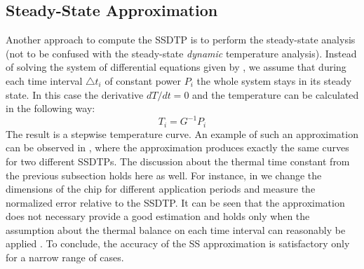 \subsection{Steady-State Approximation}
Another approach to compute the SSDTP is to perform the steady-state analysis \cite{huang2009} (not to be confused with the steady-state \emph{dynamic} temperature analysis). Instead of solving the system of differential equations given by , we assume that during each time interval $\triangle t_i$ of constant power $P_i$ the whole system stays in its steady state. In this case the derivative \mbox{$dT/dt = 0$} and the temperature can be calculated in the following way:
\[
  T_i = G^{-1} P_i
\]
The result is a stepwise temperature curve. An example of such an approximation can be observed in , where the approximation produces exactly the same curves for two different SSDTPs. The discussion about the thermal time constant from the previous subsection holds here as well. For instance, in  we change the dimensions of the chip for different application periods and measure the normalized error relative to the SSDTP. It can be seen that the approximation does not necessary provide a good estimation and holds only when the assumption about the thermal balance on each time interval can reasonably be applied \cite{huang2009}. To conclude, the accuracy of the SS approximation is satisfactory only for a narrow range of cases.
